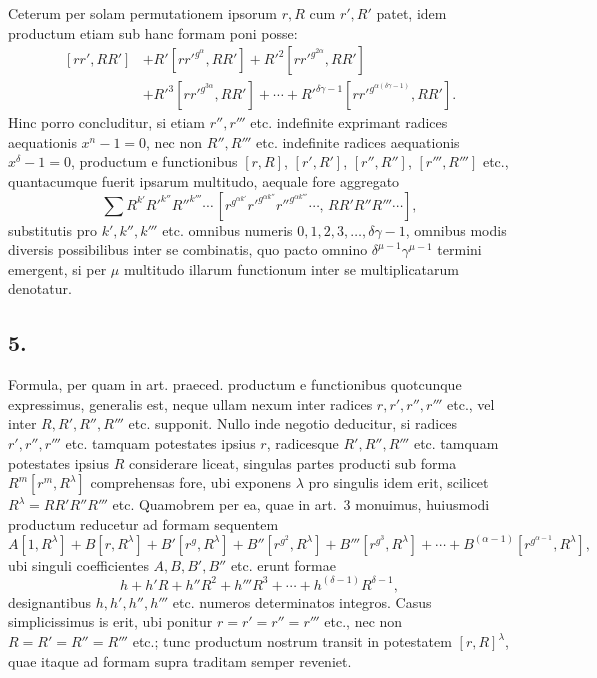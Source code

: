 \documentclass[12pt]{article}
\begin{document}
Ceterum per solam permutationem ipsorum $r,R$ cum $r',R'$ patet, idem productum etiam sub hanc formam poni posse:
\[
\begin{aligned}
[rr',RR']&+R'[rr'^{g^\alpha},RR']+R'^2[rr'^{g^{2\alpha}},RR']\\
&+R'^3[rr'^{g^{3\alpha}},RR']+\cdots+
R'^{\delta\gamma-1}[rr'^{g^{\alpha(\delta\gamma-1)}},RR'].
\end{aligned}
\]
Hinc porro concluditur, si etiam $r'',r'''$ etc. indefinite exprimant radices aequationis $x^n-1=0$, nec non $R'',R'''$ etc. indefinite radices aequationis $x^\delta-1=0$, productum e functionibus $[r,R]$, $[r',R']$, $[r'',R'']$, $[r''',R''']$ etc., quantacumque fuerit ipsarum multitudo, aequale fore aggregato
\[
\sum R^{k'}R'^{k''}R''^{k'''}\cdots
\,[r^{g^{\alpha k'}}r'^{g^{\alpha k''}}r''^{g^{\alpha k'''}}\cdots,\,
RR'R''R'''\cdots],
\]
substitutis pro $k',k'',k'''$ etc. omnibus numeris $0,1,2,3,\ldots,\delta\gamma-1$, omnibus modis diversis possibilibus inter se combinatis, quo pacto omnino $\delta^{\mu-1}\gamma^{\mu-1}$ termini emergent, si per $\mu$ multitudo illarum functionum inter se multiplicatarum denotatur.

\subsection*{5.}

Formula, per quam in art. praeced. productum e functionibus quotcunque expressimus, generalis est, neque ullam nexum inter radices $r,r',r'',r'''$ etc., vel inter $R,R',R'',R'''$ etc. supponit. Nullo inde negotio deducitur, si radices $r',r'',r'''$ etc. tamquam potestates ipsius $r$, radicesque $R',R'',R'''$ etc. tamquam potestates ipsius $R$ considerare liceat, singulas partes producti sub forma $R^m[r^m,R^\lambda]$ comprehensas fore, ubi exponens $\lambda$ pro singulis idem erit, scilicet $R^\lambda=RR'R''R'''$ etc. Quamobrem per ea, quae in art.~3 monuimus, huiusmodi productum reducetur ad formam sequentem
\[
A[1,R^\lambda]+B[r,R^\lambda]+B'[r^g,R^\lambda]+B''[r^{g^2},R^\lambda]
+B'''[r^{g^3},R^\lambda]+\cdots+B^{(\alpha-1)}[r^{g^{\alpha-1}},R^\lambda],
\]
ubi singuli coefficientes $A,B,B',B''$ etc. erunt formae
\[
h+h'R+h''R^2+h'''R^3+\cdots+h^{(\delta-1)}R^{\delta-1},
\]
designantibus $h,h',h'',h'''$ etc. numeros determinatos integros. Casus simplicissimus is erit, ubi ponitur $r=r'=r''=r'''$ etc., nec non $R=R'=R''=R'''$ etc.; tunc productum nostrum transit in potestatem $[r,R]^\lambda$, quae itaque ad formam supra traditam semper reveniet.
\end{document}
